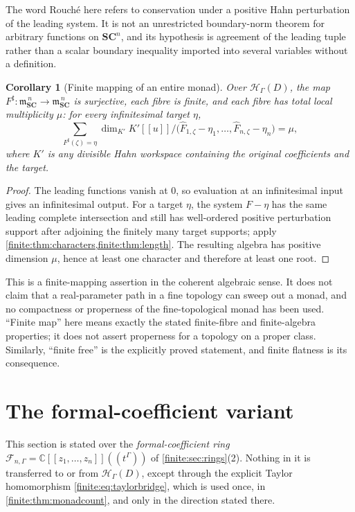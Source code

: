 \documentclass[11pt,letterpaper]{article}
\newtheorem{corollary}[theorem]{Corollary}
\theoremstyle{definition}
\theoremstyle{remark}
\newcommand{\SC}{\mathbf{SC}}
\newcommand{\C}{\mathbb C}
\newcommand{\HH}{\mathscr H}
\newcommand{\Af}{\mathscr F}
\newcommand{\mm}{\mathfrak m}
\newcommand{\sh}{^{\sharp}}
\numberwithin{equation}{section}
\begin{document}
The word Rouch\'e here refers to conservation under a positive Hahn perturbation of the leading system. It is not an unrestricted boundary-norm theorem for arbitrary functions on $\SC^n$, and its hypothesis is agreement of the leading tuple rather than a scalar boundary inequality imported into several variables without a definition.

\begin{corollary}[Finite mapping of an entire monad]
\label{finite:cor:monadmap}
Over $\HH_\Gamma(D)$, the map $F\sh:\mm_{\SC}^{\,n}\to\mm_{\SC}^{\,n}$ is surjective, each fibre is finite, and each fibre has total local multiplicity $\mu$: for every infinitesimal target $\eta$,
\[
 \sum_{F\sh(\zeta)=\eta}
 \dim_{K'}K'[[u]]\big/
 \bigl(\widehat F_{1,\zeta}-\eta_1,\ldots,\widehat F_{n,\zeta}-\eta_n\bigr)=\mu,
\]
where $K'$ is any divisible Hahn workspace containing the original coefficients and the target.
\end{corollary}

\begin{proof}
The leading functions vanish at $0$, so evaluation at an infinitesimal input gives an infinitesimal output. For a target $\eta$, the system $F-\eta$ has the same leading complete intersection and still has well-ordered positive perturbation support after adjoining the finitely many target supports; apply \cref{finite:thm:characters,finite:thm:length}. The resulting algebra has positive dimension $\mu$, hence at least one character and therefore at least one root.
\end{proof}

This is a finite-mapping assertion in the coherent algebraic sense. It does not claim that a real-parameter path in a fine topology can sweep out a monad, and no compactness or properness of the fine-topological monad has been used. ``Finite map'' here means exactly the stated finite-fibre and finite-algebra properties; it does not assert properness for a topology on a proper class. Similarly, ``finite free'' is the explicitly proved statement, and finite flatness is its consequence.

\section{The formal-coefficient variant}
\label{finite:sec:formal}

This section is stated over the \emph{formal-coefficient ring} $\Af_{n,\Gamma}=\C[[z_1,\ldots,z_n]]((t^\Gamma))$ of \cref{finite:sec:rings}(2). Nothing in it is transferred to or from $\HH_\Gamma(D)$, except through the explicit Taylor homomorphism \eqref{finite:eq:taylorbridge}, which is used once, in \cref{finite:thm:monadcount}, and only in the direction stated there.
\end{document}
